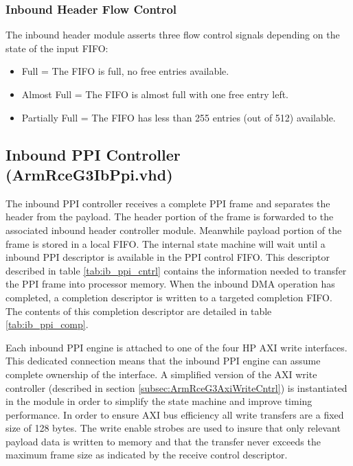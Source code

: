 \documentclass[11pt]{article}
\begin{document}
\subsubsection{Inbound Header Flow Control}

The inbound header module asserts three flow control signals depending on the state of the input FIFO:

\begin{itemize}
  \item Full           = The FIFO is full, no free entries available.
  \item Almost Full    = The FIFO is almost full with one free entry left.
  \item Partially Full = The FIFO has less than 255 entries (out of 512) available.
\end{itemize}

\subsection{Inbound PPI Controller (ArmRceG3IbPpi.vhd)}
\label{subsec:ArmRceG3IbPpi}

The inbound PPI controller receives a complete PPI frame and separates the header from the payload. The header portion of the frame is forwarded  
to the associated inbound header controller module. Meanwhile payload portion of the frame is stored in a local FIFO. The internal state machine will
wait until a inbound PPI descriptor is available in the PPI control FIFO. This descriptor described in table \ref{tab:ib_ppi_cntrl} contains
the information needed to transfer the PPI frame into processor memory. When the inbound DMA operation has completed, a completion descriptor
is written to a targeted completion FIFO. The contents of this completion descriptor are detailed in table \ref{tab:ib_ppi_comp}.

Each inbound PPI engine is attached to one of the four HP AXI write interfaces. This dedicated connection means that the inbound PPI engine
can assume complete ownership of the interface. A simplified version of the AXI write controller (described in section \ref{subsec:ArmRceG3AxiWriteCntrl})
is instantiated in the module in order to simplify the state machine and improve timing performance. In order to ensure AXI bus efficiency all write 
transfers are a fixed size of 128 bytes. The write enable strobes are used to insure that only relevant payload data is written to memory and that the
transfer never exceeds the maximum frame size as indicated by the receive control descriptor.  
\end{document}
